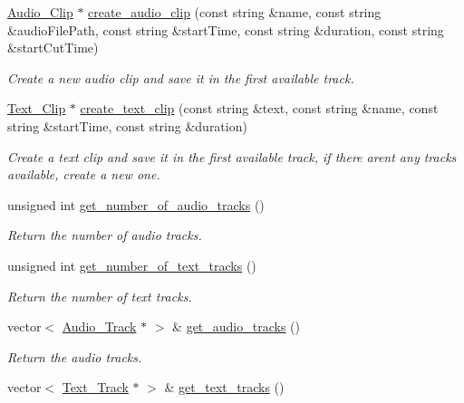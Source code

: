 \begin{DoxyCompactItemize}
\mbox{\hyperlink{classprz_1_1_audio___clip}{Audio\+\_\+\+Clip}} $\ast$ \mbox{\hyperlink{classprz_1_1_sequence_a736917b939054ae04941bdede0a16e4a}{create\+\_\+audio\+\_\+clip}} (const string \&name, const string \&audio\+File\+Path, const string \&start\+Time, const string \&duration, const string \&start\+Cut\+Time)
\begin{DoxyCompactList}\small\item\em Create a new audio clip and save it in the first available track. \end{DoxyCompactList}\item 
\mbox{\hyperlink{classprz_1_1_text___clip}{Text\+\_\+\+Clip}} $\ast$ \mbox{\hyperlink{classprz_1_1_sequence_a2179bcb2b410d08a589d60543d09c87f}{create\+\_\+text\+\_\+clip}} (const string \&text, const string \&name, const string \&start\+Time, const string \&duration)
\begin{DoxyCompactList}\small\item\em Create a text clip and save it in the first available track, if there aren\textquotesingle{}t any tracks available, create a new one. \end{DoxyCompactList}\item 
unsigned int \mbox{\hyperlink{classprz_1_1_sequence_a2d0ac9ea8804465100b36bb36a687799}{get\+\_\+number\+\_\+of\+\_\+audio\+\_\+tracks}} ()
\begin{DoxyCompactList}\small\item\em Return the number of audio tracks. \end{DoxyCompactList}\item 
unsigned int \mbox{\hyperlink{classprz_1_1_sequence_a1f00232c23dda0a52686d2012b6990c5}{get\+\_\+number\+\_\+of\+\_\+text\+\_\+tracks}} ()
\begin{DoxyCompactList}\small\item\em Return the number of text tracks. \end{DoxyCompactList}\item 
vector$<$ \mbox{\hyperlink{classprz_1_1_audio___track}{Audio\+\_\+\+Track}} $\ast$ $>$ \& \mbox{\hyperlink{classprz_1_1_sequence_aa2e32091a59da3e33ef846ae61cacca8}{get\+\_\+audio\+\_\+tracks}} ()
\begin{DoxyCompactList}\small\item\em Return the audio tracks. \end{DoxyCompactList}\item 
vector$<$ \mbox{\hyperlink{classprz_1_1_text___track}{Text\+\_\+\+Track}} $\ast$ $>$ \& \mbox{\hyperlink{classprz_1_1_sequence_a7f39a3d45d20f4f65811d8603b90fa83}{get\+\_\+text\+\_\+tracks}} ()

\end{DoxyCompactItemize}
